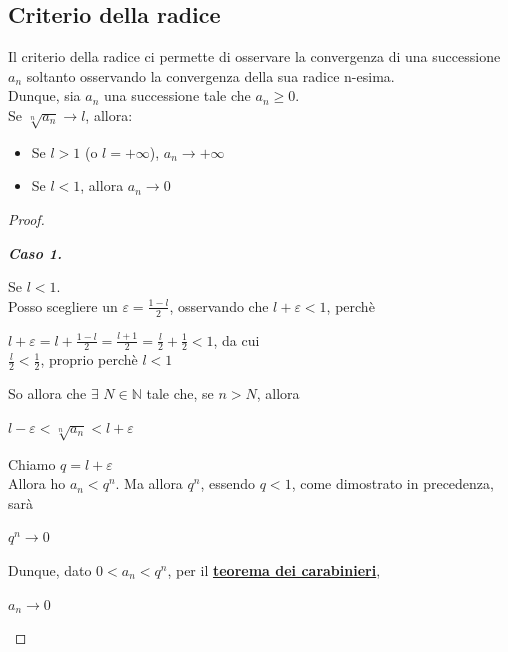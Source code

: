 \documentclass{article}
\theoremstyle{definition}
\begin{document}
\subsection{Criterio della radice}
Il criterio della radice ci permette di osservare la convergenza di una successione $a_n$ soltanto osservando la convergenza della sua radice n-esima.
\\
Dunque, sia $a_n$ una successione tale che $a_n \geqslant 0$.
\\
Se $\sqrt[n]{a_n}\longrightarrow l$, allora:
\begin{itemize}
    \item Se $l >1$ (o $l=+\infty$), $a_n \longrightarrow +\infty$
    \item Se $l<1$, allora $a_n \longrightarrow 0$
\end{itemize}
\begin{proof}
    \begin{center}
        \textbf{\textit{Caso 1.}}
    \end{center}
    Se $l<1$.
    \\
    Posso scegliere un $\varepsilon=\frac{1-l}{2}$, osservando che $l+\varepsilon<1$, perchè
    \begin{center}
        $l+\varepsilon=l+\frac{1-l}{2}=\frac{l+1}{2}=\frac{l}{2}+\frac{1}{2} < 1$, da cui
        \\
        $\frac{l}{2}<\frac{1}{2}$, proprio perchè $l<1$
    \end{center}
So allora che $\exists$\,\,$N \in \mathbb{N}$ tale che, se $n>N$, allora 
\begin{center}
    $l-\varepsilon<\sqrt[n]{a_n}<l+\varepsilon$
\end{center}
Chiamo $q=l+\varepsilon$
\\
Allora ho $a_n<q^n$.
Ma allora $q^n$, essendo $q<1$, come dimostrato in precedenza, sarà
\begin{center}
    $q^n \longrightarrow 0$
\end{center}
Dunque, dato $0<a_n<q^n$, per il \underline{\textbf{teorema dei carabinieri}},
\begin{center}
    $a_n \longrightarrow 0$
\end{center}
\end{proof}

\newpage
\end{document}
